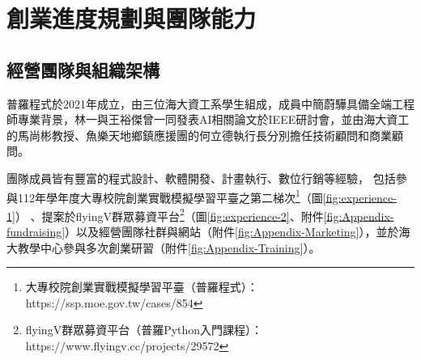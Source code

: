\section{創業進度規劃與團隊能力}

\subsection{經營團隊與組織架構}

普羅程式於2021年成立，由三位海大資工系學生組成，成員中簡蔚驊具備全端工程師專業背景，林一與王裕傑曾一同發表AI相關論文於IEEE研討會，並由海大資工的馬尚彬教授、魚樂天地鄉鎮應援團的何立德執行長分別擔任技術顧問和商業顧問。

團隊成員皆有豐富的程式設計、軟體開發、計畫執行、數位行銷等經驗，
包括參與112年學年度大專校院創業實戰模擬學習平臺之第二梯次\footnote{大專校院創業實戰模擬學習平臺（普羅程式）：https://ssp.moe.gov.tw/cases/854}（圖\ref{fig:experience-1}）
、提案於flyingV群眾募資平台\footnote{flyingV群眾募資平台（普羅Python入門課程）：https://www.flyingv.cc/projects/29572}（圖\ref{fig:experience-2}、附件\ref{fig:Appendix-fundraising}）以及經營團隊社群與網站（附件\ref{fig:Appendix-Marketing}），並於海大教學中心參與多次創業研習（附件\ref{fig:Appendix-Training}）。

